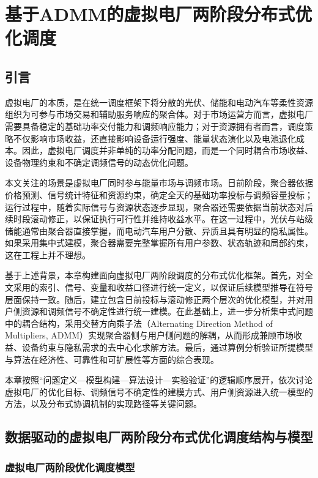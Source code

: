 \chapter{基于ADMM的虚拟电厂两阶段分布式优化调度}
\label{chap:vpp_admm}

\section{引言}
\label{sec:vpp_admm_intro}

虚拟电厂的本质，是在统一调度框架下将分散的光伏、储能和电动汽车等柔性资源组织为可参与市场交易和辅助服务响应的聚合体。对于市场运营方而言，虚拟电厂需要具备稳定的基础功率交付能力和调频响应能力；对于资源拥有者而言，调度策略不仅影响市场收益，还直接影响设备运行强度、能量状态演化以及电池退化成本。因此，虚拟电厂调度并非单纯的功率分配问题，而是一个同时耦合市场收益、设备物理约束和不确定调频信号的动态优化问题。

本文关注的场景是虚拟电厂同时参与能量市场与调频市场。日前阶段，聚合器依据价格预测、信号统计特征和资源约束，确定全天的基础功率投标与调频容量投标；运行过程中，随着实际信号与资源状态逐步显现，聚合器还需要依据当前状态对后续时段滚动修正，以保证执行可行性并维持收益水平。在这一过程中，光伏与站级储能通常由聚合器直接掌握，而电动汽车用户分散、异质且具有明显的隐私属性。如果采用集中式建模，聚合器需要完整掌握所有用户参数、状态轨迹和局部约束，这在工程上并不理想。

基于上述背景，本章构建面向虚拟电厂两阶段调度的分布式优化框架。首先，对全文采用的索引、信号、变量和收益口径进行统一定义，以保证后续模型推导在符号层面保持一致。随后，建立包含日前投标与滚动修正两个层次的优化模型，并对用户侧资源和调频信号不确定性进行统一建模。在此基础上，进一步分析集中式问题中的耦合结构，采用交替方向乘子法（Alternating Direction Method of Multipliers, ADMM）实现聚合器侧与用户侧问题的解耦，从而形成兼顾市场收益、设备约束与隐私需求的去中心化求解方法。最后，通过算例分析验证所提模型与算法在经济性、可靠性和可扩展性等方面的综合表现。

本章按照“问题定义—模型构建—算法设计—实验验证”的逻辑顺序展开，依次讨论虚拟电厂的优化目标、调频信号不确定性的建模方式、用户侧资源进入统一模型的方法，以及分布式协调机制的实现路径等关键问题。

\section{数据驱动的虚拟电厂两阶段分布式优化调度结构与模型}
\label{sec:vpp_admm_model}

\subsection{虚拟电厂两阶段优化调度模型}
\label{subsec:vpp_admm_model_two_stage}

